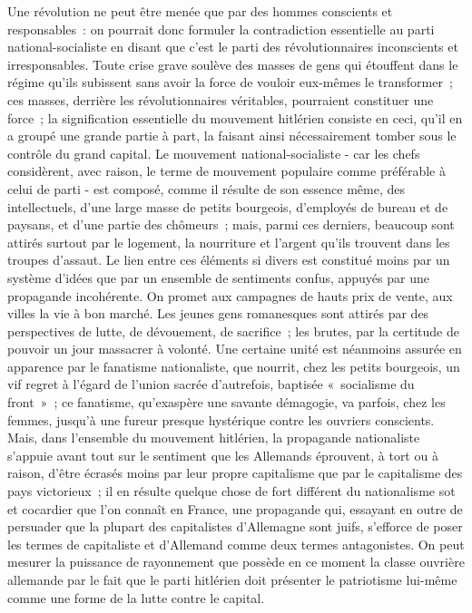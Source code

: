 \documentclass[french,twoside]{book} %
\begin{document}
\noindent Une révolution ne peut être menée que par des hommes conscients et responsables : on pourrait donc formuler la contradiction essentielle au parti national-socialiste en disant que c'est le parti des révolutionnaires inconscients et irresponsables. Toute crise grave soulève des masses de gens qui étouffent dans le régime qu'ils subissent sans avoir la force de vouloir eux-mêmes le transformer ; ces masses, derrière les révolutionnaires véritables, pourraient constituer une force ; la signification essentielle du mouvement hitlérien con­siste en ceci, qu'il en a groupé une grande partie à part, la faisant ainsi nécessairement tomber sous le contrôle du grand capital. Le mouvement national-socialiste - car les chefs considèrent, avec raison, le terme de mouve­ment populaire comme préférable à celui de parti - est composé, comme il résulte de son essence même, des intellectuels, d'une large masse de petits bourgeois, d'employés de bureau et de paysans, et d'une partie des chômeurs ; mais, parmi ces derniers, beaucoup sont attirés surtout par le logement, la nourriture et l'argent qu'ils trouvent dans les troupes d'assaut. Le lien entre ces éléments si divers est constitué moins par un système d'idées que par un ensemble de sentiments confus, appuyés par une propagande incohérente. On promet aux campagnes de hauts prix de vente, aux villes la vie à bon marché. Les jeunes gens romanesques sont attirés par des perspectives de lutte, de dévouement, de sacrifice ; les brutes, par la certitude de pouvoir un jour massacrer à volonté. Une certaine unité est néanmoins assurée en apparence par le fanatisme nationaliste, que nourrit, chez les petits bourgeois, un vif regret à l'égard de l'union sacrée d'autrefois, baptisée « socialisme du front » ; ce fanatisme, qu'exaspère une savante démagogie, va parfois, chez les fem­mes, jusqu'à une fureur presque hystérique contre les ouvriers conscients. Mais, dans l'ensemble du mouvement hitlérien, la propagande nationaliste s'appuie avant tout sur le sentiment que les Allemands éprouvent, à tort ou à raison, d'être écrasés moins par leur propre capitalisme que par le capitalisme des pays victorieux ; il en résulte quelque chose de fort différent du natio­nalisme sot et cocardier que l'on connaît en France, une propagande qui, essayant en outre de persuader que la plupart des capitalistes d'Allemagne sont juifs, s'efforce de poser les termes de capitaliste et d'Allemand comme deux termes antagonistes. On peut mesurer la puissance de rayonnement que possède en ce moment la classe ouvrière allemande par le fait que le parti hitlérien doit présenter le patriotisme lui-même comme une forme de la lutte contre le capital.\par
\end{document}
